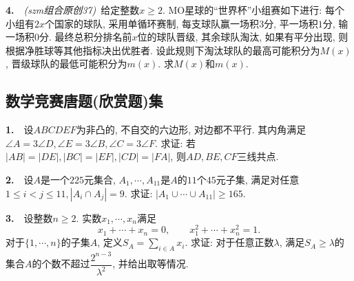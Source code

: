 \vspace{23em}

\textbf{4.}~~\textit{(szm组合原创37)}~给定整数$x \geq 2$. MO星球的“世界杯”小组赛如下进行: 每个小组有$2x$个国家的球队, 采用单循环赛制, 每支球队赢一场积$3$分, 平一场积$1$分, 输一场积$0$分. 最终总积分排名前$x$位的球队晋级, 其余球队淘汰, 如果有平分出现, 则根据净胜球等其他指标决出优胜者. 设此规则下淘汰球队的最高可能积分为$M(x)$, 晋级球队的最低可能积分为$m(x)$. 求$M(x)$和$m(x)$. 


\newpage

\subsection*{数学竞赛唐题(欣赏题)集}

\textbf{1.}~~设$ABCDEF$为非凸的, 不自交的六边形, 对边都不平行. 其内角满足$\angle A = 3\angle D, \angle E = 3\angle B, \angle C = 3\angle F$. 求证: 若$|AB|=|DE|,|BC|=|EF|,|CD|=|FA|$, 则$AD,BE,CF$三线共点. 

\newpage
\textbf{2.}~~设$A$是一个$225$元集合, $A_1,\cdots ,A_{11}$是$A$的$11$个$45$元子集, 满足对任意$1\leq i<j \leq 11, |A_i \cap A_j|=9$. 求证: $|A_1 \cup \cdots \cup A_{11}| \geq 165$. 

\newpage
\textbf{3.}~~设整数$n \geq 2$. 实数$x_1,\cdots ,x_n$满足$$x_1+\cdots +x_n=0,\qquad x_1^2+\cdots +x_n^2=1.$$
对于$\{ 1,\cdots ,n \}$的子集$A$, 定义$\displaystyle S_A= \sum_{i \in A}x_i$. 求证: 对于任意正数$\lambda$, 满足$S_A \geq \lambda$的集合$A$的个数不超过$\dfrac{2^{n-3}}{\lambda ^2}$, 并给出取等情况. 














